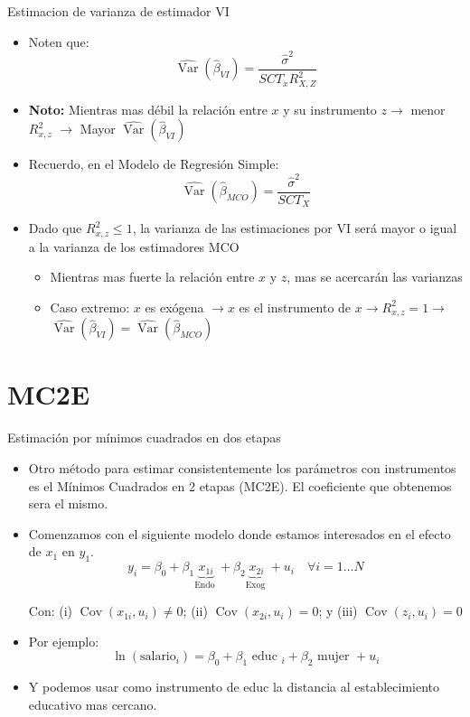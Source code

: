 \documentclass[10pt]{beamer}
\begin{document}
\begin{frame}{Estimacion de varianza de estimador VI}
    \begin{itemize}
        \item Noten que:
        $$
        \hat{\operatorname{Var}}\left(\hat{\beta}_{V I}\right)=\frac{\hat{\sigma}^{2}}{S C T_{x} R_{X, Z}^{2}}
        $$
        \item \textbf{Noto:} Mientras mas débil la relación entre $x$ y su instrumento $z \rightarrow$ menor $R_{x, z}^{2}$ $\rightarrow$ Mayor $\hat{\operatorname{Var}}\left(\hat{\beta}_{V I}\right)$
        \item Recuerdo, en el Modelo de Regresión Simple:
        $$
        \hat{\operatorname{Var}}\left(\hat{\beta}_{M C O}\right)=\frac{\hat{\sigma}^{2}}{S C T_{X}}
        $$
        \item Dado que $R_{x, z}^{2} \leq 1$, la varianza de las estimaciones por VI será mayor o igual a la varianza de los estimadores MCO
        \begin{itemize}
            \item Mientras mas fuerte la relación entre $x$ y $z$, mas se acercarán las varianzas
            \item Caso extremo: $x$ es exógena $\rightarrow x$ es el instrumento de $x \rightarrow R_{x, z}^{2}=1 \rightarrow$ $\hat{\operatorname{Var}}\left(\hat{\beta}_{V I}\right)=\hat{\operatorname{Var}}\left(\hat{\beta}_{M C O}\right)$
        \end{itemize}
    \end{itemize}
\end{frame}

\section{MC2E}

\begin{frame}{Estimación por mínimos cuadrados en dos etapas}
    \begin{itemize}
        \item Otro método para estimar consistentemente los parámetros con instrumentos es el Mínimos Cuadrados en 2 etapas (MC2E). El coeficiente que obtenemos sera el mismo.
        \item Comenzamos con el siguiente modelo donde estamos interesados en el efecto de $x_{1}$ en $y_{1}$.
        $$
        y_{i}=\beta_{0}+\beta_{1} \underbrace{x_{1 i}}_{\text {Endo }}+\beta_{2} \underbrace{x_{2 i}}_{\text {Exog }}+u_{i} \quad \forall i=1 \ldots N
        $$
        
        Con: (i) $\operatorname{Cov}\left(x_{1 i}, u_{i}\right) \neq 0$; (ii) $\operatorname{Cov}\left(x_{2 i}, u_{i}\right)=0$; y (iii) $\operatorname{Cov}\left(z_{i}, u_{i}\right)=0$
        \item  Por ejemplo:
        $$
        \operatorname{ln}\left(\text{salario}_{i}\right)=\beta_{0}+\beta_{1} \text { educ }_{i}+\beta_{2} \text { mujer }+u_{i}
        $$
        \item Y podemos usar como instrumento de educ la distancia al establecimiento educativo mas cercano.
    \end{itemize}
\end{frame}
\end{document}
